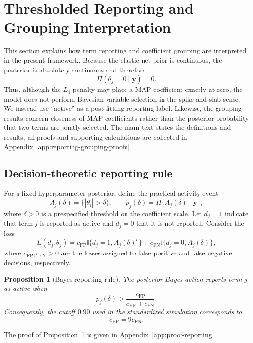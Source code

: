 \documentclass[preprint,12pt,authoryear]{elsarticle}
\newtheorem{proposition}{Proposition}
\def\bs{\boldsymbol}
\begin{document}
\section{Thresholded Reporting and Grouping Interpretation}
\label{sec:theory}

This section explains how term reporting and coefficient grouping are
interpreted in the present framework. Because the elastic-net prior is
continuous, the posterior is absolutely continuous and therefore
\[
\Pi(\theta_j=0\mid\bs y)=0.
\]
Thus, although the \(L_1\) penalty may place a MAP coefficient exactly at zero,
the model does not perform Bayesian variable selection in the spike-and-slab
sense. We instead use ``active'' as a post-fitting reporting label. Likewise,
the grouping results concern closeness of MAP coefficients rather than the
posterior probability that two terms are jointly selected. The main text states
the definitions and results; all proofs and supporting calculations are
collected in Appendix~\ref{app:reporting-grouping-proofs}.

\subsection{Decision-theoretic reporting rule}

For a fixed-hyperparameter posterior, define the practical-activity event
\[
A_j(\delta)=\{|\theta_j|>\delta\},
\qquad
p_j(\delta)=\Pi\{A_j(\delta)\mid\bs y\},
\]
where \(\delta>0\) is a prespecified threshold on the coefficient scale. Let
\(d_j=1\) indicate that term \(j\) is reported as active and \(d_j=0\) that it
is not reported. Consider the loss
\[
L(d_j,\theta_j)
=
c_{\mathrm{FP}}\mathbb I\{d_j=1,A_j(\delta)^c\}
+
c_{\mathrm{FN}}\mathbb I\{d_j=0,A_j(\delta)\},
\]
where \(c_{\mathrm{FP}},c_{\mathrm{FN}}>0\) are the losses assigned to false
positive and false negative decisions, respectively.

\begin{proposition}[Bayes reporting rule]
\label{prop:reporting-decision}
The posterior Bayes action reports term \(j\) as active when
\[
p_j(\delta)
>
\frac{c_{\mathrm{FP}}}
     {c_{\mathrm{FP}}+c_{\mathrm{FN}}}.
\]
Consequently, the cutoff \(0.90\) used in the standardized simulation
corresponds to
\[
c_{\mathrm{FP}}=9c_{\mathrm{FN}}.
\]
\end{proposition}

The proof of Proposition~\ref{prop:reporting-decision} is given in
Appendix~\ref{app:proof-reporting}.
\end{document}
